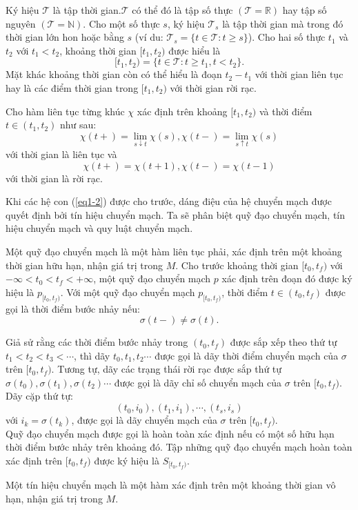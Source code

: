 \documentclass[14pt,a4paper,oneside]{report}		%
\begin{document}
Ký hiệu $\mathcal{T}$ là tập thời gian.$\mathcal{T}$ có thể đó là tập số thực $(\mathcal{T} = \mathbb{R})$ hay tập số nguyên $(\mathcal{T} = \mathbb{N})$. Cho một số thực $s$, ký hiệu $\mathcal{T}_s$ là tập thời gian mà trong đó thời gian lớn hon hoặc bằng $s$ (ví du: $\mathcal{T}_s=\{t\in\mathcal{T} : t\geq s\}$). Cho hai số thực $t_1$ và $t_2$ với $t_1 < t_2$, khoảng thời gian $[t_1, t_2)$ được hiểu là
$$[t_1, t_2)=\{t\in\mathcal{T}: t\geq t_1, t<t_2\}.$$
Mặt khác khoảng thời gian còn có thể hiểu là đoạn $t_2 - t_1$ với thời gian liên tục hay là các điểm thời gian trong $[t_1,t_2)$ với thời gian rời rạc. 

Cho hàm liên tục từng khúc $\chi$ xác định trên khoảng $[t_1,t_2)$ và thời điểm $t \in (t_1,t_2)$ như sau:
$$\chi(t+)=\lim_{s\downarrow t}\chi(s), \chi(t-)=\lim_{s\uparrow t}\chi(s)$$
với thời gian là liên tục và
$$\chi(t+)=\chi(t+1), \chi(t-)=\chi(t-1)$$
với thời gian là rời rạc.

Khi các hệ con (\ref{eq1-2}) được cho trước, dáng điệu của hệ chuyển mạch được quyết định bởi tín hiệu chuyển mạch. Ta sẽ phân biệt quỹ đạo chuyển mạch, tín hiệu chuyển mạch và quy luật chuyển mạch.

Một quỹ đạo chuyển mạch là một hàm liên tục phải, xác định trên một khoảng thời gian hữu hạn, nhận giá trị trong $M$.
Cho trước khoảng thời gian $[t_0,t_f)$ với $-\infty < t_0 < t_f < +\infty$, một quỹ đạo chuyển mạch $p$ xác định trên đoạn đó được ký hiệu là $p_{[t_0,t_f)}$. Với một quỹ đạo chuyển mạch $p_{[t_0,t_f)}$, thời điểm $t\in (t_0,t_f)$ được gọi là thời điểm bước nhảy nếu:
$$\sigma(t-)\neq\sigma(t).$$

Giả sử rằng các thời điểm bước nhảy trong $(t_0, t_f)$ được sắp xếp theo thứ tự $t_1 < t_2 < t_3 < \cdots$, thì dãy $t_0,t_1,t_2\cdots$ được gọi là dãy thời điểm chuyển mạch của $\sigma$ trên $[t_0,t_f)$. Tương tự, dãy các trạng thái rời rạc được sắp thứ tự $\sigma(t_0),\sigma(t_1),\sigma(t_2)\cdots$ được gọi là dãy chỉ số chuyển mạch của $\sigma$ trên $[t_0,t_f)$. Dãy cặp thứ tự:
$$(t_0,i_0),(t_1,i_1),\cdots,(t_s,i_s)$$
với $i_k=\sigma(t_k)$, được gọi là dãy chuyển mạch của $\sigma$ trên $[t_0,t_f)$.\\
Quỹ đạo chuyển mạch được gọi là hoàn toàn xác định nếu có một số hữu hạn thời điểm bước nhảy trên khoảng đó. Tập những quỹ đạo chuyển mạch hoàn toàn xác định trên $[t_0,t_f)$ được ký hiệu là $S_{[t_0,t_f)}$.

Một tín hiệu chuyển mạch là một hàm xác định trên một khoảng thời gian vô hạn, nhận giá trị trong $M$.
\end{document}
